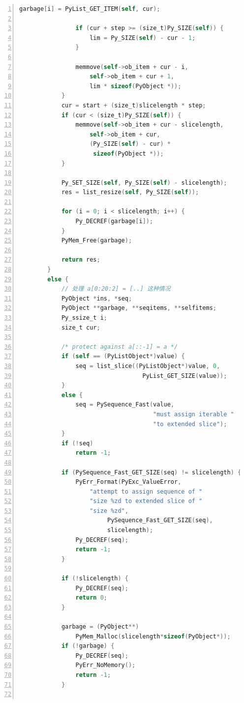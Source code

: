 \begin{lstlisting}[language=C, numbers=left, numbersep=1em, numberstyle=\footnotesize , breaklines=true]
                garbage[i] = PyList_GET_ITEM(self, cur);

                if (cur + step >= (size_t)Py_SIZE(self)) {
                    lim = Py_SIZE(self) - cur - 1;
                }

                memmove(self->ob_item + cur - i,
                    self->ob_item + cur + 1,
                    lim * sizeof(PyObject *));
            }
            cur = start + (size_t)slicelength * step;
            if (cur < (size_t)Py_SIZE(self)) {
                memmove(self->ob_item + cur - slicelength,
                    self->ob_item + cur,
                    (Py_SIZE(self) - cur) *
                     sizeof(PyObject *));
            }

            Py_SET_SIZE(self, Py_SIZE(self) - slicelength);
            res = list_resize(self, Py_SIZE(self));

            for (i = 0; i < slicelength; i++) {
                Py_DECREF(garbage[i]);
            }
            PyMem_Free(garbage);

            return res;
        }
        else {
            // 处理 a[0:20:2] = [..] 这种情况
            PyObject *ins, *seq;
            PyObject **garbage, **seqitems, **selfitems;
            Py_ssize_t i;
            size_t cur;

            /* protect against a[::-1] = a */
            if (self == (PyListObject*)value) {
                seq = list_slice((PyListObject*)value, 0,
                                   PyList_GET_SIZE(value));
            }
            else {
                seq = PySequence_Fast(value,
                                      "must assign iterable "
                                      "to extended slice");
            }
            if (!seq)
                return -1;

            if (PySequence_Fast_GET_SIZE(seq) != slicelength) {
                PyErr_Format(PyExc_ValueError,
                    "attempt to assign sequence of "
                    "size %zd to extended slice of "
                    "size %zd",
                         PySequence_Fast_GET_SIZE(seq),
                         slicelength);
                Py_DECREF(seq);
                return -1;
            }

            if (!slicelength) {
                Py_DECREF(seq);
                return 0;
            }

            garbage = (PyObject**)
                PyMem_Malloc(slicelength*sizeof(PyObject*));
            if (!garbage) {
                Py_DECREF(seq);
                PyErr_NoMemory();
                return -1;
            }


\end{lstlisting}
